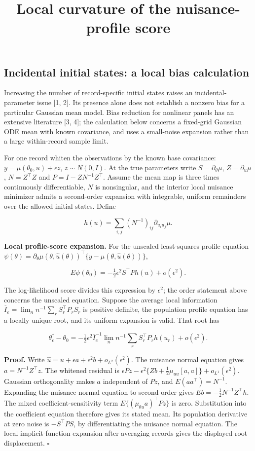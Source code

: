 \documentclass[
  american,
  11pt,
]{article}
\title{Local curvature of the nuisance-profile score}
\author{}
\date{}
\begin{document}
\maketitle

\subsection{Incidental initial states: a local bias
calculation}\label{incidental-initial-states-a-local-bias-calculation}

Increasing the number of record-specific initial states raises an
incidental-parameter issue {[}1, 2{]}. Its presence alone does not
establish a nonzero bias for a particular Gaussian mean model. Bias
reduction for nonlinear panels has an extensive literature {[}3, 4{]};
the calculation below concerns a fixed-grid Gaussian ODE mean with known
covariance, and uses a small-noise expansion rather than a large
within-record sample limit.

For one record whiten the observations by the known base covariance:
\(y=\mu(\theta_0,u)+\epsilon z\), \(z\sim N(0,I)\). At the true
parameters write \(S=\partial_\theta\mu\), \(Z=\partial_u\mu\),
\(N=Z^\top Z\) and \(P=I-ZN^{-1}Z^\top\). Assume the mean map is three
times continuously differentiable, \(N\) is nonsingular, and the
interior local nuisance minimizer admits a second-order expansion with
integrable, uniform remainders over the allowed initial states. Define

\[
h(u)=\sum_{i,j}(N^{-1})_{ij}\partial_{u_i u_j}\mu.
\]

\textbf{Local profile-score expansion.} For the unscaled least-squares
profile equation
\(\psi(\theta)=\partial_\theta\mu(\theta,\widehat u(\theta))^\top\{y-\mu(\theta,\widehat u(\theta))\}\),

\[
E\psi(\theta_0)=-\tfrac12\epsilon^2S^\top P h(u)+o(\epsilon^2).
\]

The log-likelihood score divides this expression by \(\epsilon^2\); the
order statement above concerns the unscaled equation. Suppose the
average local information
\(\overline I_e=\lim_n n^{-1}\sum_r S_r^\top P_r S_r\) is positive
definite, the population profile equation has a locally unique root, and
its uniform expansion is valid. That root has

\[
\theta_\epsilon^\dagger-\theta_0
=-\tfrac12\epsilon^2\overline I_e^{-1}
\lim_n n^{-1}\sum_r S_r^\top P_r h(u_r)+o(\epsilon^2).
\]

\textbf{Proof.} Write
\(\widehat u=u+\epsilon a+\epsilon^2b+o_{L^2}(\epsilon^2)\). The
nuisance normal equation gives \(a=N^{-1}Z^\top z\). The whitened
residual is
\(\epsilon Pz-\epsilon^2\{Zb+\tfrac12\mu_{uu}[a,a]\}+o_{L^1}(\epsilon^2)\).
Gaussian orthogonality makes \(a\) independent of \(Pz\), and
\(E(aa^\top)=N^{-1}\). Expanding the nuisance normal equation to second
order gives \(E b=-\tfrac12N^{-1}Z^\top h\). The mixed
coefficient-sensitivity term \(E\{(\mu_{\theta u}a)^\top Pz\}\) is zero.
Substitution into the coefficient equation therefore gives its stated
mean. Its population derivative at zero noise is \(-S^\top P S\), by
differentiating the nuisance normal equation. The local
implicit-function expansion after averaging records gives the displayed
root displacement. \(\square\)
\end{document}
